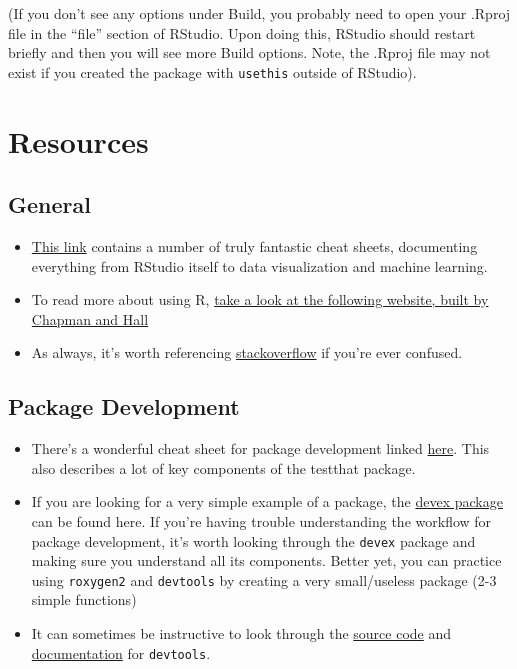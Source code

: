 \documentclass[
]{book}
\providecommand{\tightlist}{%
  \setlength{\itemsep}{0pt}\setlength{\parskip}{0pt}}
\begin{document}
(If you don't see any options under Build, you probably need to open your .Rproj file in the ``file'' section of RStudio. Upon doing this, RStudio should restart briefly and then you will see more Build options. Note, the .Rproj file may not exist if you created the package with \texttt{usethis} outside of RStudio).

\hypertarget{resources}{%
\chapter{Resources}\label{resources}}

\hypertarget{general}{%
\section{General}\label{general}}

\begin{itemize}
\tightlist
\item
  \href{https://www.rstudio.com/resources/cheatsheets/}{This link} contains a number of truly fantastic cheat sheets, documenting everything from RStudio itself to data visualization and machine learning.
\item
  To read more about using R, \href{http://adv-r.had.co.nz/}{take a look at the following website, built by Chapman and Hall}
\item
  As always, it's worth referencing \href{https://stackoverflow.com/questions/tagged/r/}{stackoverflow} if you're ever confused.
\end{itemize}

\hypertarget{package-development-1}{%
\section{Package Development}\label{package-development-1}}

\begin{itemize}
\tightlist
\item
  There's a wonderful cheat sheet for package development linked \href{https://www.rstudio.com/wp-content/uploads/2015/06/devtools-cheatsheet.pdf}{here}. This also describes a lot of key components of the testthat package.
\item
  If you are looking for a very simple example of a package, the \href{https://github.com/IQSS/Rbuild/tree/master/devex}{devex package} can be found here. If you're having trouble understanding the workflow for package development, it's worth looking through the \texttt{devex} package and making sure you understand all its components. Better yet, you can practice using \texttt{roxygen2} and \texttt{devtools} by creating a very small/useless package (2-3 simple functions)
\item
  It can sometimes be instructive to look through the \href{https://www.rdocumentation.org/packages/devtools/versions/1.13.3/source}{source code} and \href{https://www.rdocumentation.org/packages/devtools/versions/1.13.3}{documentation} for \texttt{devtools}.
\end{itemize}
\end{document}
